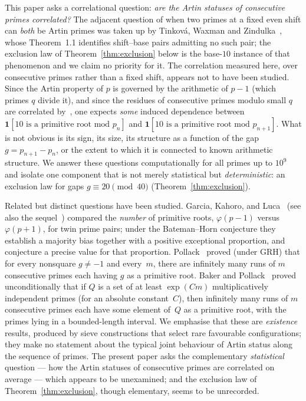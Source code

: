 \documentclass[11pt]{amsart}
\theoremstyle{definition}
\begin{document}
This paper asks a correlational question: \emph{are the Artin statuses of
consecutive primes correlated?} The adjacent question of when two primes at a
fixed even shift can \emph{both} be Artin primes was taken up by Tinkov\'a,
Waxman and Zindulka~\cite{TinkovaWaxmanZindulka2023}, whose Theorem~1.1
identifies shift--base pairs admitting no such pair; the exclusion law of
Theorem~\ref{thm:exclusion} below is the base-$10$ instance of that
phenomenon and we claim no priority for it. The correlation measured here,
over consecutive primes rather than a fixed shift, appears not to have been
studied. Since the
Artin property of $p$ is governed by the arithmetic of $p - 1$ (which primes
$q$ divide it), and since the residues of consecutive primes modulo small $q$
are correlated by~\cite{LOS2016}, one expects \emph{some} induced dependence
between $\mathbf{1}[10 \text{ is a primitive root mod } p_n]$ and
$\mathbf{1}[10 \text{ is a primitive root mod } p_{n+1}]$. What is not obvious
is its sign, its size, its structure as a function of the gap
$g = p_{n+1} - p_n$, or the extent to which it is connected to known
arithmetic structure. We answer these questions computationally for all primes up to
$10^9$ and isolate one component that is not merely statistical but
\emph{deterministic}: an exclusion law for gaps $g \equiv 20 \pmod{40}$
(Theorem~\ref{thm:exclusion}).

Related but distinct questions have been studied. Garcia, Kahoro, and
Luca~\cite{GarciaKahoroLuca2019} (see also the sequel~\cite{GarciaLucaShiUdell2020})
compared the \emph{number} of primitive roots, $\varphi(p-1)$ versus
$\varphi(p+1)$, for twin prime pairs; under the Bateman--Horn conjecture they
establish a majority bias together with a positive exceptional proportion, and
conjecture a precise value for that proportion. Pollack~\cite{Pollack2014} proved
(under GRH) that for every nonsquare $g \neq -1$ and every~$m$, there are
infinitely many runs of $m$ consecutive primes each having $g$ as a primitive
root. Baker and Pollack~\cite{BakerPollack2016} proved unconditionally that
if $Q$ is a set of at least $\exp(Cm)$ multiplicatively independent primes
(for an absolute constant~$C$), then infinitely many runs of $m$ consecutive
primes each have some element of~$Q$ as a primitive root, with the primes
lying in a bounded-length interval.
We emphasise that these are
\emph{existence} results, produced by sieve constructions that select rare
favourable configurations; they make no statement about the typical joint
behaviour of Artin status along the sequence of primes. The present paper asks
the complementary \emph{statistical} question --- how the Artin statuses of
consecutive primes are correlated on average --- which appears to be
unexamined; and the exclusion law of Theorem~\ref{thm:exclusion}, though
elementary, seems to be unrecorded.
\end{document}
